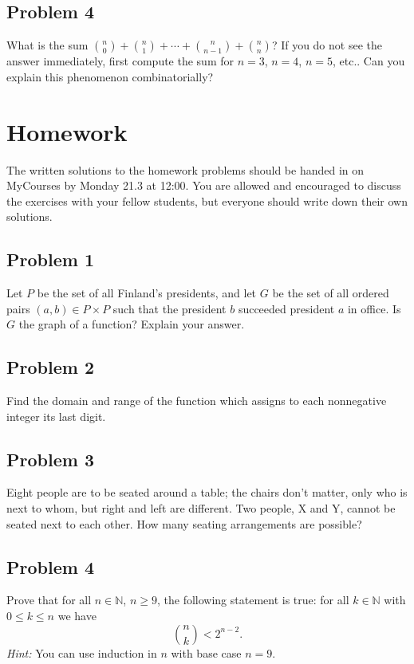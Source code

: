 \documentclass{amsart}
\newcommand{\N}{\mathbb{N}}
\theoremstyle{definition} \newtheorem*{definition}{Definition}
\theoremstyle{remark} \newtheorem*{ex}{Example}
\begin{document}
 \subsection*{Problem 4}
What is the sum $\binom{n}{0}+\binom{n}{1}+\cdots + \binom{n}{n-1}+\binom{n}{n}$? If you do not see the answer immediately, first compute the sum for $n=3$, $n=4$, $n=5$, etc.. Can you explain this phenomenon combinatorially?

\pagebreak

 \section*{Homework}
The written solutions to the homework problems should be handed in on MyCourses by Monday 21.3 at 12:00. You are allowed and encouraged to discuss the exercises with your fellow students, but everyone should write down their own solutions.

\subsection*{Problem 1}
Let $P$ be the set of all Finland's presidents, and let $G$ be the set of all ordered pairs $(a, b) \in P \times P$ such that the president $b$ succeeded president $a$ in office.  Is $G$ the graph of a function?  Explain your answer.

\subsection*{Problem 2}
Find the domain and range of the function which assigns to each nonnegative integer its last digit.

\subsection*{Problem 3}
Eight people are to be seated around a table; the chairs don't matter, only who is next to whom, but right and left are different. Two people, X and Y, cannot be seated next to each other. How many seating arrangements are possible?

\subsection*{Problem 4}
Prove that for all $n \in \N$, $n \geq 9$, the following statement is true: for all $k \in \N$ with $0 \leq k \leq n$ we have
$$\binom{n}{k} < 2^{n-2}.$$
\textit{Hint:} You can use induction in $n$ with base case $n = 9$.
\end{document}
